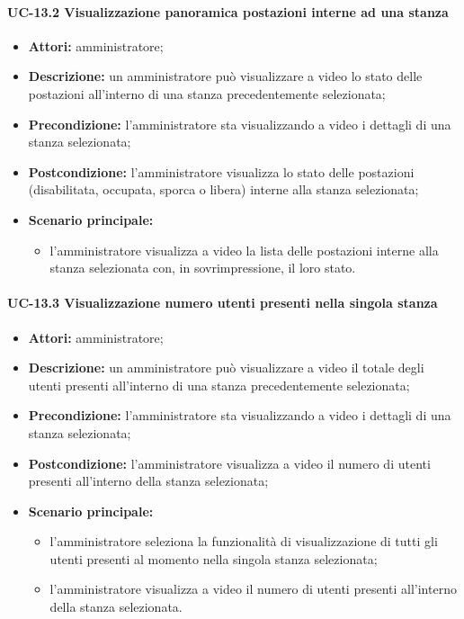 \paragraph{UC-13.2 Visualizzazione panoramica postazioni interne ad una stanza}
\begin{itemize}
    \item \textbf{Attori:} amministratore;
    \item \textbf{Descrizione:} un amministratore pu\`{o} visualizzare a video lo stato delle postazioni all'interno di una stanza precedentemente selezionata;
    \item \textbf{Precondizione:} l'amministratore sta visualizzando a video i dettagli di una stanza selezionata;
    \item \textbf{Postcondizione:} l'amministratore visualizza lo stato delle postazioni (disabilitata, occupata, sporca o libera) interne alla stanza selezionata;
    \item \textbf{Scenario principale:}
    \begin{itemize}
        \item l'amministratore visualizza a video la lista delle postazioni interne alla stanza selezionata con, in sovrimpressione, il loro stato.
    \end{itemize}
\end{itemize}

\paragraph{UC-13.3 Visualizzazione numero utenti presenti nella singola stanza}
\begin{itemize}
    \item \textbf{Attori:} amministratore;
    \item \textbf{Descrizione:} un amministratore pu\`{o} visualizzare a video il totale degli utenti presenti all'interno di una stanza precedentemente selezionata;
    \item \textbf{Precondizione:} l'amministratore sta visualizzando a video i dettagli di una stanza selezionata;
    \item \textbf{Postcondizione:} l'amministratore visualizza a video il numero di utenti presenti all'interno della stanza selezionata;
    \item \textbf{Scenario principale:}
    \begin{itemize}
        \item l'amministratore seleziona la funzionalità di visualizzazione di tutti gli utenti presenti al momento nella singola stanza selezionata;
        \item l'amministratore visualizza a video il numero di utenti presenti all'interno della stanza selezionata.
    \end{itemize}
\end{itemize}


